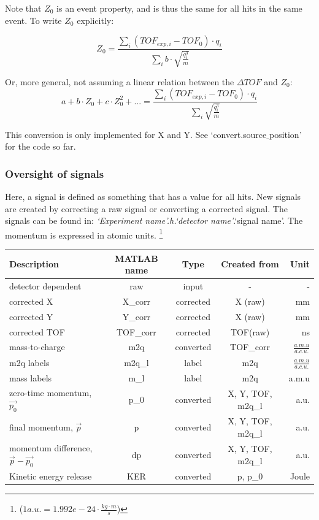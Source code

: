 Note that $Z_0$ is an event property, and is thus the same for all hits in the same event. To write $Z_0$ explicitly:

\begin{equation}
Z_0 = \frac{\sum_i{\left( TOF_{exp, i} - TOF_0 \right) \cdot q_i}}
{\sum_i{b \cdot \sqrt{\tfrac{q_i^3}{m}}}}
\end{equation}

Or, more general, not assuming a linear relation between the $\Delta TOF $ and $Z_0$:
\begin{equation}
a + b \cdot Z_0 + c \cdot Z_0^2 + ... = \frac{\sum_i{\left( TOF_{exp, i} - TOF_0 \right) \cdot q_i}}
{\sum_i{\sqrt{\tfrac{q_i^3}{m}}}}
\end{equation}

This conversion is only implemented for X and Y. See `convert.source$\_$position' for the code so far.

\subsubsection{Oversight of signals}

Here, a signal is defined as something that has a value for all hits. New signals are created by correcting a raw signal or converting a corrected signal. The signals can be found in: \emph{`Experiment name'.h.`detector name'}.`signal name'. The momentum is expressed in atomic units. \footnote{($ 1 a.u. = 1.992e-24 \cdot \tfrac{kg \cdot m}{s}$)}	

\begin{tabular}{l|c|c|c|r}
Description & MATLAB name & Type & Created from & Unit\\
\hline
detector dependent 						& raw 							& input	 								& - 														&- \\
corrected X										& X\_corr						& corrected						& X (raw)		 									& mm \\
corrected Y										& Y\_corr						& corrected						& X (raw) 										& mm \\
corrected TOF									& TOF\_corr				& corrected						& TOF(raw)  									& ns \\
mass-to-charge 								& m2q 							& converted 						& TOF\_corr									& $\tfrac{a.m.u}{a.c.u.}$ \\ 
m2q labels											& m2q\_l 					& label 									& m2q												& $\tfrac{a.m.u}{a.c.u.}$ \\ 
mass labels 										& m\_l							& label 									& m2q												& a.m.u \\
zero-time momentum, $\vec{p_0}$			& p\_0		& converted 						& X, Y, TOF, m2q\_l						& a.u.\\
final momentum, $\vec{p}$		& p 									& converted 						& X, Y, TOF, m2q\_l						& a.u.\\
momentum difference, $\vec{p} - \vec{p_0}$ & dp& converted 						& X, Y, TOF, m2q\_l						& a.u.\\
Kinetic energy release 					& KER 							& converted 						& p, p\_0 											& Joule \\
\end{tabular}	


